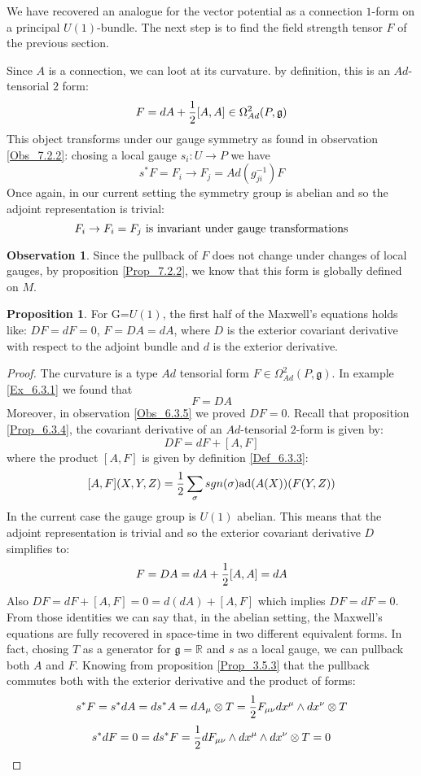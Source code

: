 \documentclass[12pt,a4paper]{report}
\theoremstyle{definition}
\theoremstyle{Theorem}
\newtheorem{Prop}[Def]{Proposition}
\theoremstyle{definition}
\theoremstyle{definition}
\newtheorem{Obs}[Def]{Observation}
\begin{document}
	We have recovered an analogue for the vector potential as a connection $1$-form on a principal $U(1)$-bundle. The next step is to find the field strength tensor $F$ of the previous section.
	\begin{comment}
		\begin{Obs}
			Since the Lie algebra is of dimension 1 there is a clear isomorphism: let $T$ be a generator for $\mathbb{R}$, then
			$$A_1\otimes T\longrightarrow A_1$$
			is a $1$-form on the manifold.
		\end{Obs}
	\end{comment}
	Since $A$ is a connection, we can loot at its curvature. by definition, this is an $Ad$-tensorial $2$ form:
	$$F=dA+{1\over 2}[A,A]\in \Omega^2_{Ad}(P,\mathfrak{g})$$
	This object transforms under our gauge symmetry as found in observation \ref{Obs_7.2.2}: chosing a local gauge $s_i:U\rightarrow P$ we have
	$$s^*F=F_i\rightarrow F_j= Ad(g_{ji}^{-1})F$$
	Once again, in our current setting the symmetry group is abelian and so the adjoint representation is trivial:
	$$F_i\rightarrow F_i=F_j\hbox{ is invariant under gauge transformations}$$
	\begin{Obs}
		Since the pullback of $F$ does not change under changes of local gauges, by proposition \ref{Prop_7.2.2}, we know that this form is globally defined on $M$.
	\end{Obs}
	\begin{Prop}
		For G=$U(1)$, the first half of the Maxwell's equations holds like: $DF=dF=0$, $F=DA=dA$, where $D$ is the exterior covariant derivative with respect to the adjoint bundle and $d$ is the exterior derivative.
	\end{Prop}
	\begin{proof}
		The curvature is a type $Ad$ tensorial form $F\in \Omega^2_{Ad}(P,\mathfrak{g})$. In example \ref{Ex_6.3.1} we found that
		$$F=DA$$
		Moreover, in observation \ref{Obs_6.3.5} we proved $DF=0$. Recall that proposition \ref{Prop_6.3.4}, the covariant derivative of an $Ad$-tensorial $2$-form is given by:
		$$DF=dF+[A,F]$$
		where the product $[A,F]$ is given by definition \ref{Def_6.3.3}:
		$$[A,F](X,Y,Z)={1\over 2}\sum_\sigma sgn(\sigma)\hbox{ad}(A(X))(F(Y,Z))$$
		In the current case the gauge group is $U(1)$ abelian. This means that the adjoint representation is trivial and so the exterior covariant derivative $D$ simplifies to:
		$$F=DA=dA+{1\over 2}[A,A]=dA$$
		Also $DF=dF+[A,F]=0=d(dA)+[A,F]$ which implies $DF=dF=0$. From those identities we can say that, in the abelian setting, the Maxwell's equations are fully recovered in space-time in two different equivalent forms. In fact, chosing $T$ as a generator for $\mathfrak{g}=\mathbb{R}$ and $s$ as a local gauge, we can pullback both $A$ and $F$. Knowing from proposition \ref{Prop_3.5.3} that the pullback commutes both with the exterior derivative and the product of forms:
		$$s^*F=s^*dA=ds^*A=dA_\mu\otimes T={1\over 2}F_{\mu\nu} dx^\mu\wedge dx^\nu \otimes T$$
		$$s^*dF=0=ds^*F={1\over 2}dF_{\mu\nu}\wedge dx^\mu\wedge dx^\nu \otimes T=0$$
	\end{proof}
\end{document}

